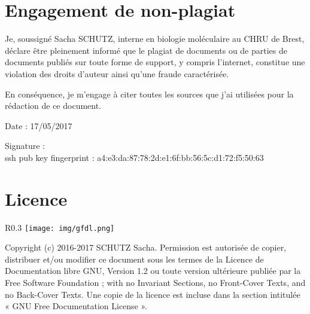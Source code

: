 \documentclass[12pt,a4paper]{article}
\begin{document}

\newpage

\section*{Engagement de non-plagiat}

Je, soussigné Sacha SCHUTZ, interne en biologie moléculaire au CHRU de Brest, déclare être pleinement informé que le plagiat de
documents ou de parties de documents publiés sur toute forme de
support, y compris l'internet, constitue une violation des droits
d'auteur ainsi qu'une fraude caractérisée.

En conséquence, je m'engage à citer toutes les sources que j'ai
utilisées pour la rédaction de ce document.

Date : 17/05/2017

\vspace{0.5cm}

Signature : \\

ssh pub key fingerprint : a4:e3:da:87:78:2d:e1:6f:bb:56:5c:d1:72:f5:50:63
\vfill

\section*{Licence}

\begin{wrapfigure}{R}{0.3\textwidth}
\texttt{[image: img/gfdl.png]}\hfill
\end{wrapfigure}

Copyright (c) 2016-2017 SCHUTZ Sacha. Permission est autorisée de copier,
distribuer et/ou modifier ce document sous les termes de la Licence de
Documentation libre GNU, Version 1.2 ou toute version ultérieure publiée
par la Free Software Foundation ; with no Invariant Sections, no
Front-Cover Texts, and no Back-Cover Texts. Une copie de la licence est
incluse dans la section intitulée « GNU Free Documentation License ».

\thispagestyle{empty}
\setcounter{page}{0}
\thispagestyle{empty}

\newpage

\tableofcontents
\newpage
\end{document}
